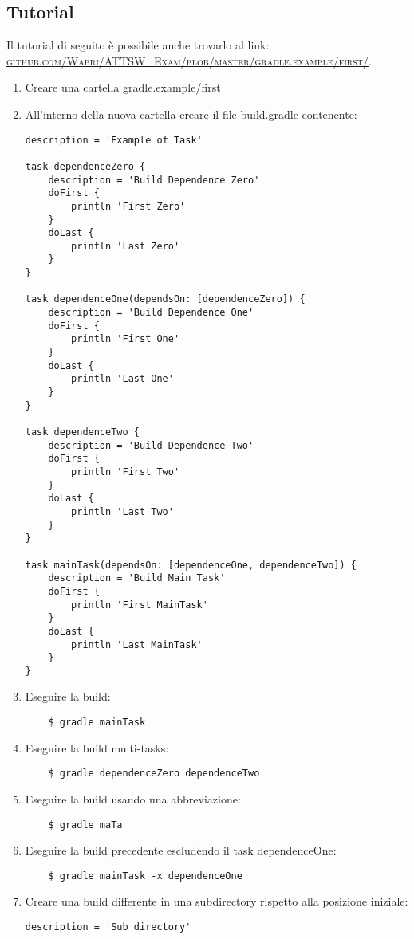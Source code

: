 \subsection{Tutorial}
Il tutorial di seguito è possibile anche trovarlo al link: \href{https://github.com/Wabri/ATTSW_Exam/blob/master/gradle.example/first/}{\textsc{github.com/Wabri/ATTSW\_Exam/blob/master/gradle.example/first/}}.
\begin{enumerate}
    \item Creare una cartella gradle.example/first
    \item All'interno della nuova cartella creare il file build.gradle contenente:
\begin{lstlisting}[frame=single]
description = 'Example of Task'

task dependenceZero {
	description = 'Build Dependence Zero'
	doFirst {
		println 'First Zero'
	}
	doLast {
		println 'Last Zero'
	}
}

task dependenceOne(dependsOn: [dependenceZero]) {
	description = 'Build Dependence One'
	doFirst {
		println 'First One'
	}
	doLast {
		println 'Last One'
	}
}

task dependenceTwo {
	description = 'Build Dependence Two'
	doFirst {
		println 'First Two'
	}
	doLast {
		println 'Last Two'
	}
}

task mainTask(dependsOn: [dependenceOne, dependenceTwo]) {
	description = 'Build Main Task'
	doFirst {
		println 'First MainTask'
	}
	doLast {
		println 'Last MainTask'
	}
}
\end{lstlisting}
    \item Eseguire la build:
\begin{verbatim}
    $ gradle mainTask
\end{verbatim}
    \item  Eseguire la build multi-tasks:
\begin{verbatim}
    $ gradle dependenceZero dependenceTwo
\end{verbatim}
    \item Eseguire la build usando una abbreviazione:
\begin{verbatim}
    $ gradle maTa
\end{verbatim}
    \item Eseguire la build precedente escludendo il task dependenceOne:
\begin{verbatim}
    $ gradle mainTask -x dependenceOne
\end{verbatim}
    \item Creare una build differente in una subdirectory rispetto alla posizione iniziale: 
\begin{lstlisting}[frame=single]
description = 'Sub directory'


\end{lstlisting}
\end{enumerate}
